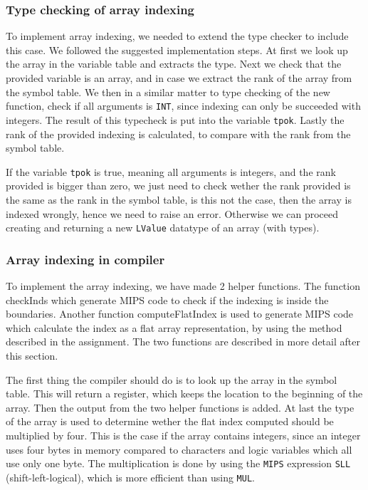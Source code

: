 \documentclass[10pt]{article}
\begin{document}
\subsubsection{Type checking of array indexing}
To implement array indexing, we needed to extend the type checker to include this case. We followed the suggested implementation steps. At first we look up the array in the variable table and extracts the type. Next we check that the provided variable is an array, and in case we extract the rank of the array from the symbol table. We then in a similar matter to type checking of the new function, check if all arguments is \texttt{INT}, since indexing can only be succeeded with integers. The result of this typecheck is put into the variable \texttt{tpok}. Lastly the rank of the provided indexing is calculated, to compare with the rank from the symbol table.

If the variable \texttt{tpok} is true, meaning all arguments is integers, and the rank provided is bigger than zero, we just need to check wether the rank provided is the same as the rank in the symbol table, is this not the case, then the array is indexed wrongly, hence we need to raise an error. Otherwise we can proceed creating and returning a new \texttt{LValue} datatype of an array (with types).

\subsubsection{Array indexing in compiler}
To implement the array indexing, we have made 2 helper functions. The function checkInds which generate MIPS code to check if the indexing is inside the boundaries. Another function computeFlatIndex is used to generate MIPS code which calculate the index as a flat array representation, by using the method described in the assignment. The two functions are described in more detail after this section.

The first thing the compiler should do is to look up the array in the symbol table. This will return a register, which keeps the location to the beginning of the array. Then the output from the two helper functions is added. At last the type of the array is used to determine wether the flat index computed should be multiplied by four. This is the case if the array contains integers, since an integer uses four bytes in memory compared to characters and logic variables which all use only one byte. The multiplication is done by using the \texttt{MIPS} expression \texttt{SLL} (shift-left-logical), which is more efficient than using \texttt{MUL}.
\end{document}
